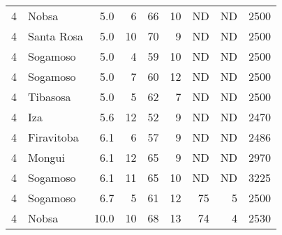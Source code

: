 \documentclass[12pt]{iopart}
\begin{document}
\begin{table}
\begin{tabular}{rlrrrrrrr}
              4 &                        Nobsa &            5.0 &                         6 &                        66 &                   10 &                        ND &                          ND &    2500 \\
              4 &        Santa Rosa &            5.0 &                        10 &                        70 &                    9 &                        ND &                          ND &    2500 \\
              4 &                     Sogamoso &            5.0 &                         4 &                        59 &                   10 &                        ND &                          ND &    2500 \\
              4 &                     Sogamoso &            5.0 &                         7 &                        60 &                   12 &                        ND &                          ND &    2500 \\
              4 &                     Tibasosa &            5.0 &                         5 &                        62 &                    7 &                        ND &                          ND &    2500 \\
              4 &                          Iza &            5.6 &                        12 &                        52 &                    9 &                        ND &                          ND &    2470 \\
              4 &                   Firavitoba &            6.1 &                         6 &                        57 &                    9 &                        ND &                          ND &    2486 \\
              4 &                       Mongui &            6.1 &                        12 &                        65 &                    9 &                        ND &                          ND &    2970 \\
              4 &                     Sogamoso &            6.1 &                        11 &                        65 &                   10 &                        ND &                          ND &    3225 \\
              4 &                     Sogamoso &            6.7 &                         5 &                        61 &                   12 &                        75 &                           5 &    2500 \\
              4 &                        Nobsa &           10.0 &                        10 &                        68 &                   13 &                        74 &                           4 &    2530 \\



\bottomrule
\end{tabular}

\end{table}
\end{document}
